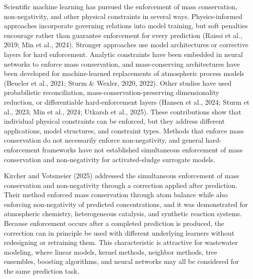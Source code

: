 \documentclass[a4paper,fleqn]{cas-sc}
\begin{document}
Scientific machine learning has pursued the enforcement of mass conservation, non-negativity, and other physical constraints in several ways. Physics-informed approaches incorporate governing relations into model training, but soft penalties encourage rather than guarantee enforcement for every prediction (Raissi et al., 2019; Min et al., 2024). Stronger approaches use model architectures or corrective layers for hard enforcement. Analytic constraints have been embedded in neural networks to enforce mass conservation, and mass-conserving architectures have been developed for machine-learned replacements of atmospheric process models (Beucler et al., 2021; Sturm \& Wexler, 2020, 2022). Other studies have used probabilistic reconciliation, mass-conservation-preserving dimensionality reduction, or differentiable hard-enforcement layers (Hansen et al., 2024; Sturm et al., 2023; Min et al., 2024; Utkarsh et al., 2025). These contributions show that individual physical constraints can be enforced, but they address different applications, model structures, and constraint types. Methods that enforce mass conservation do not necessarily enforce non-negativity, and general hard-enforcement frameworks have not established simultaneous enforcement of mass conservation and non-negativity for activated-sludge surrogate models.

Kircher and Votsmeier (2025) addressed the simultaneous enforcement of mass conservation and non-negativity through a correction applied after prediction. Their method enforced mass conservation through atom balance while also enforcing non-negativity of predicted concentrations, and it was demonstrated for atmospheric chemistry, heterogeneous catalysis, and synthetic reaction systems. Because enforcement occurs after a completed prediction is produced, the correction can in principle be used with different underlying learners without redesigning or retraining them. This characteristic is attractive for wastewater modeling, where linear models, kernel methods, neighbor methods, tree ensembles, boosting algorithms, and neural networks may all be considered for the same prediction task.
\end{document}
